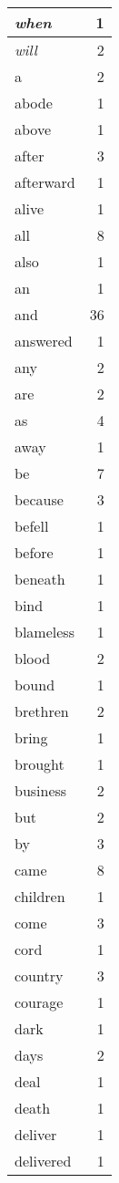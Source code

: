 \begin{center}
\begin{longtable}{l|r}
\emph{when} & 1 \\ \hline
\emph{will} & 2 \\ \hline
a & 2 \\ \hline
abode & 1 \\ \hline
above & 1 \\ \hline
after & 3 \\ \hline
afterward & 1 \\ \hline
alive & 1 \\ \hline
all & 8 \\ \hline
also & 1 \\ \hline
an & 1 \\ \hline
and & 36 \\ \hline
answered & 1 \\ \hline
any & 2 \\ \hline
are & 2 \\ \hline
as & 4 \\ \hline
away & 1 \\ \hline
be & 7 \\ \hline
because & 3 \\ \hline
befell & 1 \\ \hline
before & 1 \\ \hline
beneath & 1 \\ \hline
bind & 1 \\ \hline
blameless & 1 \\ \hline
blood & 2 \\ \hline
bound & 1 \\ \hline
brethren & 2 \\ \hline
bring & 1 \\ \hline
brought & 1 \\ \hline
business & 2 \\ \hline
but & 2 \\ \hline
by & 3 \\ \hline
came & 8 \\ \hline
children & 1 \\ \hline
come & 3 \\ \hline
cord & 1 \\ \hline
country & 3 \\ \hline
courage & 1 \\ \hline
dark & 1 \\ \hline
days & 2 \\ \hline
deal & 1 \\ \hline
death & 1 \\ \hline
deliver & 1 \\ \hline
delivered & 1 \\ \hline

\end{longtable}
\end{center}
